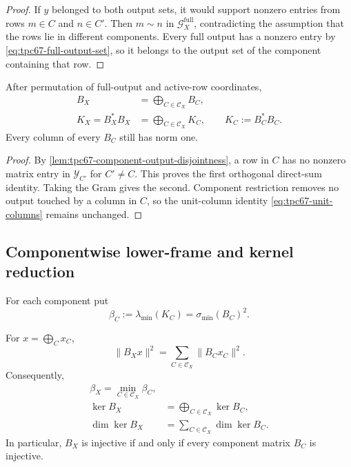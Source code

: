 \begin{proof}
If \(y\) belonged to both output sets, it would support nonzero entries
from rows \(m\in C\) and \(n\in C'\).  Then \(m\sim n\) in
\(\mathscr G_X^{\mathrm{full}}\), contradicting the assumption that the
rows lie in different components.  Every full output has a nonzero entry
by \eqref{eq:tpc67-full-output-set}, so it belongs to the output set of
the component containing that row.
\end{proof}

\begin{proposition}
\label{prop:tpc67-exact-component-blocks}
After permutation of full-output and active-row coordinates,
\begin{align}
 B_X
 &=
 \bigoplus_{C\in\mathscr C_X}B_C,
 \label{eq:tpc67-B-component-sum}\\
 K_X=B_X^*B_X
 &=
 \bigoplus_{C\in\mathscr C_X}K_C,
 \qquad
 K_C:=B_C^*B_C.
 \label{eq:tpc67-K-component-sum}
\end{align}
Every column of every \(B_C\) still has norm one.
\end{proposition}

\begin{proof}
By \cref{lem:tpc67-component-output-disjointness}, a row in \(C\) has no
nonzero matrix entry in \(\mathcal Y_{C'}\) for \(C'\ne C\).  This proves
the first orthogonal direct-sum identity.  Taking the Gram gives the
second.  Component restriction removes no output touched by a column in
\(C\), so the unit-column identity
\eqref{eq:tpc67-unit-columns} remains unchanged.
\end{proof}

\subsection{Componentwise lower-frame and kernel reduction}

For each component put
\begin{equation}
 \beta_C:=\lambda_{\min}(K_C)
          =\sigma_{\min}(B_C)^2.
 \label{eq:tpc67-component-beta}
\end{equation}

\begin{theorem}
\label{thm:tpc67-componentwise-lower-frame}
For \(x=\bigoplus_Cx_C\),
\begin{equation}
 \|B_Xx\|^2
 =
 \sum_{C\in\mathscr C_X}\|B_Cx_C\|^2.
 \label{eq:tpc67-component-energy-identity}
\end{equation}
Consequently,
\begin{align}
 \boxed{
 \beta_X
 =\min_{C\in\mathscr C_X}\beta_C,}
 \label{eq:tpc67-global-beta-minimum}\\
 \ker B_X
 &=
 \bigoplus_{C\in\mathscr C_X}\ker B_C,
 \label{eq:tpc67-kernel-component-sum}\\
 \dim\ker B_X
 &=
 \sum_{C\in\mathscr C_X}\dim\ker B_C.
 \label{eq:tpc67-nullity-component-sum}
\end{align}
In particular, \(B_X\) is injective if and only if every component matrix
\(B_C\) is injective.
\end{theorem}

